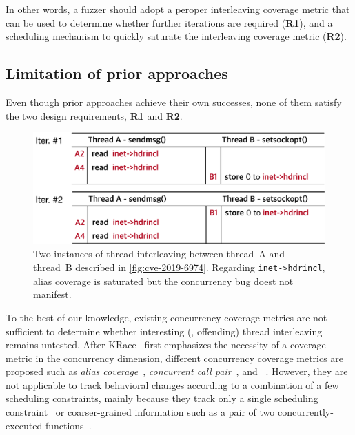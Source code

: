 In other words, a fuzzer should adopt a peroper interleaving coverage
metric that can be used to determine whether further iterations are
required (\textbf{R1}), and a scheduling mechanism to quickly saturate
the interleaving coverage metric (\textbf{R2}).



\subsection{Limitation of prior approaches}
\label{ss:existingapproaches}

Even though prior approaches achieve their own successes, none of them
satisfy the two design requirements, \textbf{R1} and \textbf{R2}.

%
%
\begin{figure}[t]
  \centering
  \includegraphics[width=0.95\linewidth]{fig/alias-coverage.pdf}
  \caption{Two instances of thread interleaving between thread~A and
    thread~B described in \autoref{fig:cve-2019-6974}. Regarding
    \texttt{inet->hdrincl}, alias coverage is saturated but the
    concurrency bug doest not manifest.}
  \label{fig:alias-coverage}
\end{figure}
%
To the best of our knowledge, existing concurrency coverage metrics
are not sufficient to determine whether interesting (\ie, offending)
thread interleaving remains untested.
%
After KRace~\cite{krace} first emphasizes the necessity of a coverage
metric in the concurrency dimension, different concurrency coverage
metrics are proposed such as \textit{alias coverage}~\cite{krace},
\textit{concurrent call pair}~\cite{conzzer}, and
\textit{}~\cite{muzz}.
%
However, they are not applicable to track behavioral changes according
to a combination of a few scheduling constraints, mainly because they
track only a single scheduling constraint~\cite{krace, muzz} or
coarser-grained information such as a pair of two
concurrently-executed functions~\cite{conzzer}.

